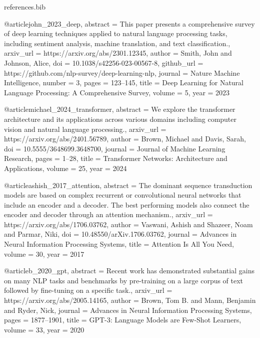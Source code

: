 \begin{filecontents}{references.bib}

@article{john_2023_deep,
  abstract = {This paper presents a comprehensive survey of deep learning techniques applied to natural language processing tasks, including sentiment analysis, machine translation, and text classification.},
  arxiv_url = {https://arxiv.org/abs/2301.12345},
  author = {Smith, John and Johnson, Alice},
  doi = {10.1038/s42256-023-00567-8},
  github_url = {https://github.com/nlp-survey/deep-learning-nlp},
  journal = {Nature Machine Intelligence},
  number = {3},
  pages = {123--145},
  title = {Deep Learning for Natural Language Processing: A Comprehensive Survey},
  volume = {5},
  year = {2023}
}

@article{michael_2024_transformer,
  abstract = {We explore the transformer architecture and its applications across various domains including computer vision and natural language processing.},
  arxiv_url = {https://arxiv.org/abs/2401.56789},
  author = {Brown, Michael and Davis, Sarah},
  doi = {10.5555/3648699.3648700},
  journal = {Journal of Machine Learning Research},
  pages = {1--28},
  title = {Transformer Networks: Architecture and Applications},
  volume = {25},
  year = {2024}
}


@article{ashish_2017_attention,
  abstract = {The dominant sequence transduction models are based on complex recurrent or convolutional neural networks that include an encoder and a decoder. The best performing models also connect the encoder and decoder through an attention mechanism.},
  arxiv_url = {https://arxiv.org/abs/1706.03762},
  author = {Vaswani, Ashish and Shazeer, Noam and Parmar, Niki},
  doi = {10.48550/arXiv.1706.03762},
  journal = {Advances in Neural Information Processing Systems},
  title = {Attention Is All You Need},
  volume = {30},
  year = {2017}
}

@article{b_2020_gpt,
  abstract = {Recent work has demonstrated substantial gains on many NLP tasks and benchmarks by pre-training on a large corpus of text followed by fine-tuning on a specific task.},
  arxiv_url = {https://arxiv.org/abs/2005.14165},
  author = {Brown, Tom B. and Mann, Benjamin and Ryder, Nick},
  journal = {Advances in Neural Information Processing Systems},
  pages = {1877--1901},
  title = {GPT-3: Language Models are Few-Shot Learners},
  volume = {33},
  year = {2020}
}


\end{filecontents}
